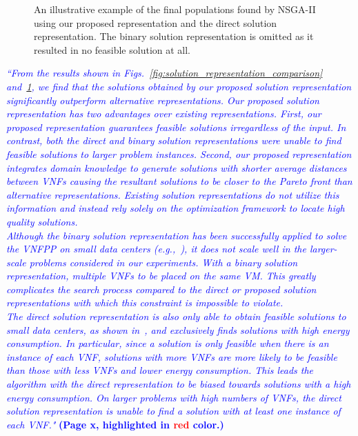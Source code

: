 \begin{enumerate}
\begin{figure}[t!]
                  \vspace{1em}
                  \caption{An illustrative example of the final populations found by NSGA-II using our proposed representation and the direct solution representation. The binary solution representation is omitted as it resulted in no feasible solution at all.}
                  \label{fig:solution_representation_objectives}
            \end{figure}

            \textcolor{blue}{\textit{
                        ``From the results shown in Figs.~\ref{fig:solution_representation_comparison} and~\ref{fig:solution_representation_objectives}, we find that the solutions obtained by our proposed solution representation significantly outperform alternative representations. Our proposed solution representation has two advantages over existing representations. First, our proposed representation guarantees feasible solutions irregardless of the input. In contrast, both the direct and binary solution representations were unable to find feasible solutions to larger problem instances. Second, our proposed representation integrates domain knowledge to generate solutions with shorter average distances between VNFs causing the resultant solutions to be closer to the Pareto front than alternative representations. Existing solution representations do not utilize this information and instead rely solely on the optimization framework to locate high quality solutions.\\
                        Although the binary solution representation has been successfully applied to solve the VNFPP on small data centers (e.g.,~\cite{ChantreF20,KaurGK020,CharismiadisTPM20}), it does not scale well in the larger-scale problems considered in our experiments. With a binary solution representation, multiple VNFs to be placed on the same VM. This greatly complicates the search process compared to the direct or proposed solution representations with which this constraint is impossible to violate.\\
                        The direct solution representation is also only able to obtain feasible solutions to small data centers, as shown in~, and exclusively finds solutions with high energy consumption. In particular, since a solution is only feasible when there is an instance of each VNF, solutions with more VNFs are more likely to be feasible than those with less VNFs and lower energy consumption. This leads the algorithm with the direct representation to be biased towards solutions with a high energy consumption. On larger problems with high numbers of VNFs, the direct solution representation is unable to find a solution with at least one instance of each VNF."
                  } \textbf{(Page x, highlighted in \textcolor{red}{red} color.)}}\\


\end{enumerate}
